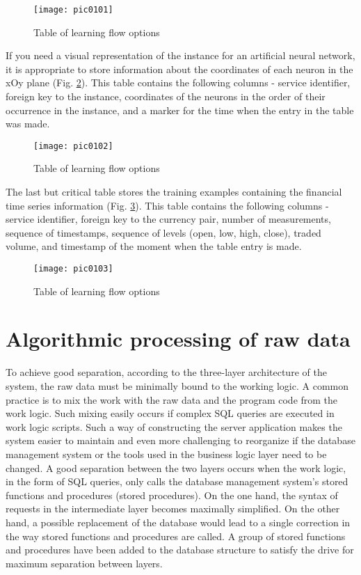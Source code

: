 \begin{figure}[h]
\centering
\texttt{[image: pic0101]}
\caption{Table of learning flow options}
\label{fig:pic0101}
\end{figure}
\FloatBarrier

If you need a visual representation of the instance for an artificial neural network, it is appropriate to store information about the coordinates of each neuron in the xOy plane (Fig. \ref{fig:pic0102}). This table contains the following columns - service identifier, foreign key to the instance, coordinates of the neurons in the order of their occurrence in the instance, and a marker for the time when the entry in the table was made.

\begin{figure}[h]
\centering
\texttt{[image: pic0102]}
\caption{Table of learning flow options}
\label{fig:pic0102}
\end{figure}
\FloatBarrier

The last but critical table stores the training examples containing the financial time series information (Fig. \ref{fig:pic0103}). This table contains the following columns - service identifier, foreign key to the currency pair, number of measurements, sequence of timestamps, sequence of levels (open, low, high, close), traded volume, and timestamp of the moment when the table entry is made.

\begin{figure}[h]
\centering
\texttt{[image: pic0103]}
\caption{Table of learning flow options}
\label{fig:pic0103}
\end{figure}
\FloatBarrier

\section{Algorithmic processing of raw data}

To achieve good separation, according to the three-layer architecture of the system, the raw data must be minimally bound to the working logic. A common practice is to mix the work with the raw data and the program code from the work logic. Such mixing easily occurs if complex SQL queries are executed in work logic scripts. Such a way of constructing the server application makes the system easier to maintain and even more challenging to reorganize if the database management system or the tools used in the business logic layer need to be changed. A good separation between the two layers occurs when the work logic, in the form of SQL queries, only calls the database management system's stored functions and procedures (stored procedures). On the one hand, the syntax of requests in the intermediate layer becomes maximally simplified. On the other hand, a possible replacement of the database would lead to a single correction in the way stored functions and procedures are called. A group of stored functions and procedures have been added to the database structure to satisfy the drive for maximum separation between layers.

